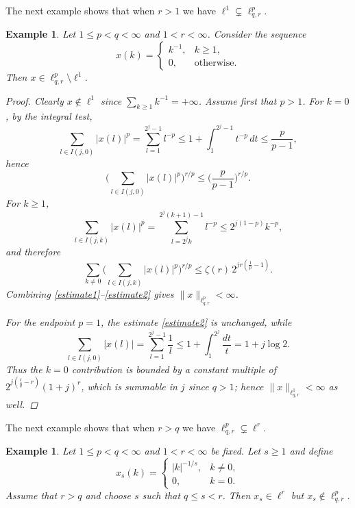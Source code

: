 \documentclass[preprint,12pt]{elsarticle}
\newtheorem{example}[theorem]{Example}
\begin{document}
The next example shows that when $r>1$ we have $\ell^{1}\subsetneq \ell^{p}_{q,r}$.
   \begin{example}
Let $1\le p<q<\infty$ and $1<r<\infty$. Consider the sequence
\[
x(k)=
\begin{cases}
k^{-1}, & k\ge 1,\\
0, & \text{otherwise}.
\end{cases}
\]
Then $x\in \ell^{p}_{q,r}\setminus \ell^{1}$.
\begin{proof}
Clearly $x\notin \ell^1$ since $\sum_{k\ge1}k^{-1}=+\infty$.
Assume first that $p>1$. For $k=0$, by the integral test,
\[
\sum_{l\in I(j,0)}|x(l)|^{p}=\sum_{l=1}^{2^{j}-1}l^{-p}
\le 1+\int_{1}^{2^{j}-1}t^{-p}\,dt
\le \frac{p}{p-1},
\]
hence
\begin{equation}\label{estimate1}
\Big( \sum_{l\in I(j,0)}|x(l)|^{p}\Big)^{r/p}\le \Big(\frac{p}{p-1}\Big)^{r/p}.
\end{equation}
For $k\ge1$,
\[
\sum_{l\in I(j,k)}|x(l)|^{p}
=\sum_{l=2^{j}k}^{2^{j}(k+1)-1}l^{-p}
\le 2^{j(1-p)}k^{-p},
\]
and therefore
\begin{equation}\label{estimate2}
\sum_{k\neq 0}\Big(\sum_{l\in I(j,k)}|x(l)|^{p}\Big)^{r/p}
\le \zeta(r)\,2^{jr(\frac1p-1)}.
\end{equation}
Combining \eqref{estimate1}--\eqref{estimate2} gives $\|x\|_{\ell^{p}_{q,r}}<\infty$.

For the endpoint $p=1$, the estimate \eqref{estimate2} is unchanged, while
\[
\sum_{l\in I(j,0)}|x(l)|
=\sum_{l=1}^{2^{j}-1}\frac1l
\le 1+\int_{1}^{2^{j}}\frac{dt}{t}
=1+j\log 2.
\]
Thus the $k=0$ contribution is bounded by a constant multiple of
$2^{j(\frac rq-r)}(1+j)^r$, which is summable in $j$ since $q>1$; hence
$\|x\|_{\ell^{1}_{q,r}}<\infty$ as well.
\end{proof}
\end{example}

The next example shows that when $r>q$ we have $ \ell^{p}_{q,r}\subsetneq\ell^{r}$.
  
\begin{example}\label{ex:strict_inclusion_r_greater_q}
Let $1\le p<q<\infty$ and $1<r<\infty$ be fixed. Let $s\ge 1$ and define
\[
x_{s}(k)=
\begin{cases}
|k|^{-1/s}, & k\neq0,\\[4pt]
0, & k=0.
\end{cases}
\]
Assume that $r>q$ and choose $s$ such that $q\le s<r$. Then $x_{s}\in\ell^{r}$ but $x_{s}\notin\ell^{p}_{q,r}$.
\end{example}
\end{document}
